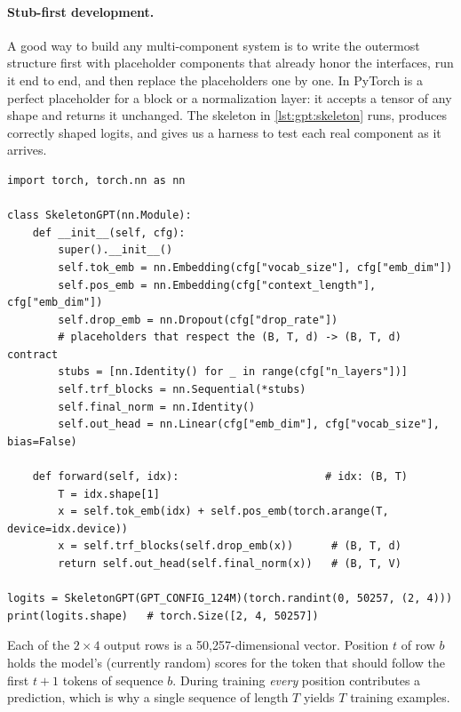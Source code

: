 \paragraph{Stub-first development.}
A good way to build any multi-component system is to write the outermost structure first with
placeholder components that already honor the interfaces, run it end to end, and then replace
the placeholders one by one. In PyTorch  is a perfect placeholder for a block
or a normalization layer: it accepts a tensor of any shape and returns it unchanged. The
skeleton in \cref{lst:gpt:skeleton} runs, produces correctly shaped logits, and gives us a
harness to test each real component as it arrives.

\begin{lstlisting}[caption={A runnable skeleton: real embeddings and head, placeholder
blocks and norm.},label={lst:gpt:skeleton}]
import torch, torch.nn as nn

class SkeletonGPT(nn.Module):
    def __init__(self, cfg):
        super().__init__()
        self.tok_emb = nn.Embedding(cfg["vocab_size"], cfg["emb_dim"])
        self.pos_emb = nn.Embedding(cfg["context_length"], cfg["emb_dim"])
        self.drop_emb = nn.Dropout(cfg["drop_rate"])
        # placeholders that respect the (B, T, d) -> (B, T, d) contract
        stubs = [nn.Identity() for _ in range(cfg["n_layers"])]
        self.trf_blocks = nn.Sequential(*stubs)
        self.final_norm = nn.Identity()
        self.out_head = nn.Linear(cfg["emb_dim"], cfg["vocab_size"], bias=False)

    def forward(self, idx):                       # idx: (B, T)
        T = idx.shape[1]
        x = self.tok_emb(idx) + self.pos_emb(torch.arange(T, device=idx.device))
        x = self.trf_blocks(self.drop_emb(x))      # (B, T, d)
        return self.out_head(self.final_norm(x))   # (B, T, V)

logits = SkeletonGPT(GPT_CONFIG_124M)(torch.randint(0, 50257, (2, 4)))
print(logits.shape)   # torch.Size([2, 4, 50257])
\end{lstlisting}

Each of the $2\times4$ output rows is a 50,257-dimensional vector. Position $t$ of row $b$ holds
the model's (currently random) scores for the token that should follow the first $t+1$ tokens of
sequence $b$. During training \emph{every} position contributes a prediction, which is why a
single sequence of length $T$ yields $T$ training examples.

